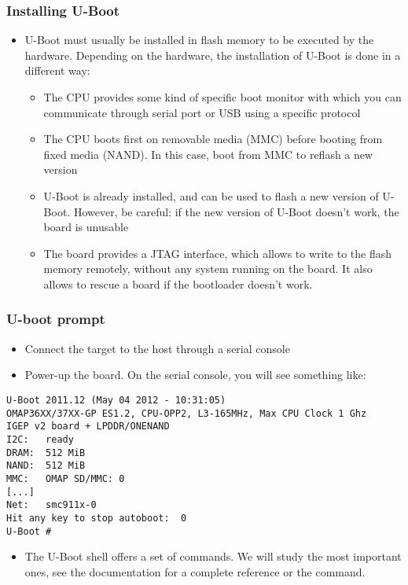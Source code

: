 \begin{frame}
  \frametitle{Installing U-Boot}
  \begin{itemize}
  \item U-Boot must usually be installed in flash memory to be
    executed by the hardware. Depending on the hardware, the
    installation of U-Boot is done in a different way:
    \begin{itemize}
    \item The CPU provides some kind of specific boot monitor with
      which you can communicate through serial port or USB using a
      specific protocol
    \item The CPU boots first on removable media (MMC) before booting
      from fixed media (NAND). In this case, boot from MMC to reflash
      a new version
    \item U-Boot is already installed, and can be used to flash a new
      version of U-Boot. However, be careful: if the new version of
      U-Boot doesn't work, the board is unusable
    \item The board provides a JTAG interface, which allows to write
      to the flash memory remotely, without any system running on the
      board. It also allows to rescue a board if the bootloader
      doesn't work.
    \end{itemize}
  \end{itemize}
\end{frame}

\begin{frame}[fragile]
  \frametitle{U-boot prompt}
  \begin{itemize}
  \item Connect the target to the host through a serial console
  \item Power-up the board. On the serial console, you will see
    something like:
  \end{itemize}
\scriptsize
\begin{verbatim}
U-Boot 2011.12 (May 04 2012 - 10:31:05)
OMAP36XX/37XX-GP ES1.2, CPU-OPP2, L3-165MHz, Max CPU Clock 1 Ghz
IGEP v2 board + LPDDR/ONENAND
I2C:   ready
DRAM:  512 MiB
NAND:  512 MiB
MMC:   OMAP SD/MMC: 0
[...]
Net:   smc911x-0
Hit any key to stop autoboot:  0
U-Boot #
\end{verbatim}
\normalsize
  \begin{itemize}
  \item The U-Boot shell offers a set of commands. We will study the
    most important ones, see the documentation for a complete
    reference or the  command.
  \end{itemize}
\end{frame}

